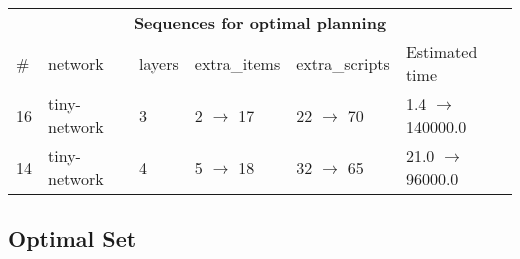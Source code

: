 \documentclass{article}
\begin{document}
                            \begin{center}
                            \begin{tabular}{l|l|l|l|l|l}
                            \multicolumn{6}{c}{\bf \large Sequences for optimal planning}\\
                            \# & network & layers & extra\_items & extra\_scripts & Estimated time\\\midrule
                            16&tiny-network&3&2 $\rightarrow$ 17&22 $\rightarrow$ 70&1.4 $\rightarrow$ 140000.0\\
14&tiny-network&4&5 $\rightarrow$ 18&32 $\rightarrow$ 65&21.0 $\rightarrow$ 96000.0
                            \end{tabular}
                            \end{center}
                    
                                \subsection*{Optimal Set}
                                
\end{document}
